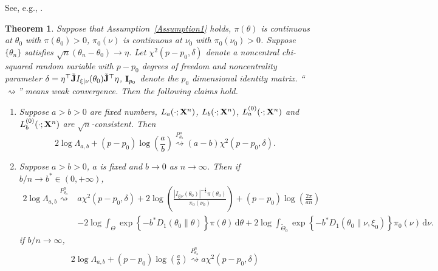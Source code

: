 \documentclass[11pt]{article}
\theoremstyle{plain}
\newtheorem{theorem}{\quad\quad Theorem}
\theoremstyle{definition}
\theoremstyle{remark}
\begin{document}
See, e.g., \cite{Erven2014}.



    \begin{theorem}\label{Thm:maintheorem}
        Suppose that Assumption~\ref{Assumption1} holds, $\pi(\theta)$ is continuous at $\theta_0$ with $\pi(\theta_0)>0$, $\pi_0(\nu)$ is continuous at $\nu_0$ with $\pi_0(\nu_0)>0$.
        Suppose $\{\theta_n\}$ satisfies $\sqrt{n}(\theta_n-\theta_0)\to \eta$.
        Let $\chi^2(p-p_0,\delta)$ denote a noncentral chi-squared random variable with $p-p_0$ degrees of freedom and noncentrality parameter $\delta=\eta^\top\tilde {\mathbf{J}} I_{\xi|\nu}(\theta_0) \tilde{\mathbf{J}}^\top\eta$,  $\mathbf{I}_{p_0}$ denote the $p_0$ dimensional identity matrix.
``$\rightsquigarrow$'' means weak convergence.
Then the following claims hold.
        \begin{enumerate}
            \item 
                Suppose $a>b>0$ are fixed numbers,
                $L_{a}(\cdot;\mathbf{X}^{n})$, $L_b(\cdot;\mathbf{X}^{n})$, $L_{a}^{(0)}(\cdot;\mathbf{X}^{n})$ and $L_b^{(0)}(\cdot;\mathbf{X}^{n})$ are $\sqrt{n}$-consistent.
                Then
        $$
        2\log \Lambda_{a,b}
+{(p-p_0)}\log \left(\frac{a}{b}\right)
        \overset{P^n_{\theta_n}}{\rightsquigarrow} 
        (a-b)\chi^2(p-p_0,\delta)
.
        $$
    \item
        Suppose $a>b>0$, $a$ is fixed and $b\to 0$ as $n \to \infty$.
        Then if $b/n \to b^* \in (0,+\infty)$,
\begin{align*}
    2\log \Lambda_{a,b}\overset{P^n_{\theta_n}}{\rightsquigarrow}
    &
     a \chi^2 (p-p_0, \delta)
     +
    2\log\left( \frac{
            \left|I_{\xi| \nu} (\theta_0)\right|^{-\frac 1 2}
    \pi(\theta_0)}{\pi_0(\nu_0)} \right)
    +{(p-p_0)} \log \left( \frac{2\pi}{an} \right)
    \\
    &
    -2\log \int_{\Theta} \exp\left\{ -b^* D_1\left( \theta_0 \| \theta \right)\right\} \pi(\theta) \, \mathrm d \theta 
    +
    2\log \int_{\tilde \Theta_0} \exp\left\{ -b^* D_1\left( \theta_0 \| \nu, \xi_0 \right)\right\} \pi_0(\nu) \, \mathrm d \nu.
\end{align*}
        if $b/n \to \infty$,
\begin{align*}
    2\log \Lambda_{a,b}
    +
    {(p-p_0)}\log \left(\frac{a}{b}\right)
    \overset{P^n_{\theta_n}}{\rightsquigarrow}
        a \chi^2(p-p_0,\delta)
\end{align*}
        \end{enumerate}
    \end{theorem}
\end{document}
